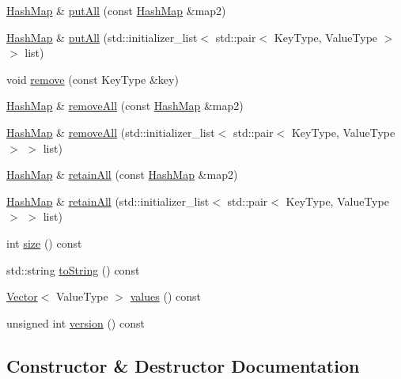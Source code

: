 \begin{DoxyCompactItemize}
\item 
\mbox{\hyperlink{classHashMap}{Hash\+Map}} \& \mbox{\hyperlink{classHashMap_a59da5e6b9b66d6582a03c07254406a40}{put\+All}} (const \mbox{\hyperlink{classHashMap}{Hash\+Map}} \&map2)
\item 
\mbox{\hyperlink{classHashMap}{Hash\+Map}} \& \mbox{\hyperlink{classHashMap_aafb5180ad67f0f661d9250ecd2dc16be}{put\+All}} (std\+::initializer\+\_\+list$<$ std\+::pair$<$ Key\+Type, Value\+Type $>$ $>$ list)
\item 
void \mbox{\hyperlink{classHashMap_ac6e7e5198a9f1c8b2cc40fbd1d0eb3b0}{remove}} (const Key\+Type \&key)
\item 
\mbox{\hyperlink{classHashMap}{Hash\+Map}} \& \mbox{\hyperlink{classHashMap_a55a494654fd27076033553d9c8347ab8}{remove\+All}} (const \mbox{\hyperlink{classHashMap}{Hash\+Map}} \&map2)
\item 
\mbox{\hyperlink{classHashMap}{Hash\+Map}} \& \mbox{\hyperlink{classHashMap_ade3869d69ed519553a774bc5c91ec021}{remove\+All}} (std\+::initializer\+\_\+list$<$ std\+::pair$<$ Key\+Type, Value\+Type $>$ $>$ list)
\item 
\mbox{\hyperlink{classHashMap}{Hash\+Map}} \& \mbox{\hyperlink{classHashMap_a1950d5bcede3332689f1080441cc065e}{retain\+All}} (const \mbox{\hyperlink{classHashMap}{Hash\+Map}} \&map2)
\item 
\mbox{\hyperlink{classHashMap}{Hash\+Map}} \& \mbox{\hyperlink{classHashMap_a92e47dca61d60d4641b73848717771f5}{retain\+All}} (std\+::initializer\+\_\+list$<$ std\+::pair$<$ Key\+Type, Value\+Type $>$ $>$ list)
\item 
int \mbox{\hyperlink{classHashMap_af9593d4a5ff4274efaf429cb4f9e57cc}{size}} () const
\item 
std\+::string \mbox{\hyperlink{classHashMap_a1fe5121d6528fdea3f243321b3fa3a49}{to\+String}} () const
\item 
\mbox{\hyperlink{classVector}{Vector}}$<$ Value\+Type $>$ \mbox{\hyperlink{classHashMap_a50ccbe4184324f0da975648a12728d20}{values}} () const
\item 
unsigned int \mbox{\hyperlink{classHashMap_a0aa696ccb72cbf928535d6b646bac1aa}{version}} () const
\end{DoxyCompactItemize}


\subsection{Constructor \& Destructor Documentation}
\mbox{\label{classHashMap_a8e7da885280257b837a2de2b94e02fcd}} 
